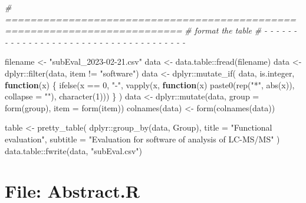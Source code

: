 \documentclass[
]{article}
\newenvironment{Shaded}{\begin{snugshade}}{\end{snugshade}}
\newcommand{\AttributeTok}[1]{\textcolor[rgb]{0.77,0.63,0.00}{#1}}
\newcommand{\CommentTok}[1]{\textcolor[rgb]{0.56,0.35,0.01}{\textit{#1}}}
\newcommand{\ControlFlowTok}[1]{\textcolor[rgb]{0.13,0.29,0.53}{\textbf{#1}}}
\newcommand{\DecValTok}[1]{\textcolor[rgb]{0.00,0.00,0.81}{#1}}
\newcommand{\FunctionTok}[1]{\textcolor[rgb]{0.00,0.00,0.00}{#1}}
\newcommand{\NormalTok}[1]{#1}
\newcommand{\OtherTok}[1]{\textcolor[rgb]{0.56,0.35,0.01}{#1}}
\newcommand{\SpecialCharTok}[1]{\textcolor[rgb]{0.00,0.00,0.00}{#1}}
\newcommand{\StringTok}[1]{\textcolor[rgb]{0.31,0.60,0.02}{#1}}
\begin{document}
\begin{Shaded}
\begin{Highlighting}[]
\CommentTok{\# ==========================================================================}
\CommentTok{\# format the table}
\CommentTok{\# {-} {-} {-} {-} {-} {-} {-} {-} {-} {-} {-} {-} {-} {-} {-} {-} {-} {-} {-} {-} {-} {-} {-} {-} {-} {-} {-} {-} {-} {-} {-} {-} {-} {-} {-} {-} {-}}

\NormalTok{filename }\OtherTok{\textless{}{-}} \StringTok{"subEval\_2023{-}02{-}21.csv"}
\NormalTok{data }\OtherTok{\textless{}{-}}\NormalTok{ data.table}\SpecialCharTok{::}\FunctionTok{fread}\NormalTok{(filename)}
\NormalTok{data }\OtherTok{\textless{}{-}}\NormalTok{ dplyr}\SpecialCharTok{::}\FunctionTok{filter}\NormalTok{(data, item }\SpecialCharTok{!=} \StringTok{"software"}\NormalTok{)}
\NormalTok{data }\OtherTok{\textless{}{-}}\NormalTok{ dplyr}\SpecialCharTok{::}\FunctionTok{mutate\_if}\NormalTok{(}
\NormalTok{  data, is.integer,}
  \ControlFlowTok{function}\NormalTok{(x) \{}
    \FunctionTok{ifelse}\NormalTok{(x }\SpecialCharTok{==} \DecValTok{0}\NormalTok{, }\StringTok{"{-}"}\NormalTok{, }
      \FunctionTok{vapply}\NormalTok{(x, }\ControlFlowTok{function}\NormalTok{(x) }\FunctionTok{paste0}\NormalTok{(}\FunctionTok{rep}\NormalTok{(}\StringTok{"*"}\NormalTok{, }\FunctionTok{abs}\NormalTok{(x)), }\AttributeTok{collapse =} \StringTok{""}\NormalTok{), }
        \FunctionTok{character}\NormalTok{(}\DecValTok{1}\NormalTok{)))}
\NormalTok{  \}}
\NormalTok{)}
\NormalTok{data }\OtherTok{\textless{}{-}}\NormalTok{ dplyr}\SpecialCharTok{::}\FunctionTok{mutate}\NormalTok{(data, }\AttributeTok{group =} \FunctionTok{form}\NormalTok{(group), }\AttributeTok{item =} \FunctionTok{form}\NormalTok{(item))}
\FunctionTok{colnames}\NormalTok{(data) }\OtherTok{\textless{}{-}} \FunctionTok{form}\NormalTok{(}\FunctionTok{colnames}\NormalTok{(data))}

\NormalTok{table }\OtherTok{\textless{}{-}} \FunctionTok{pretty\_table}\NormalTok{(}
\NormalTok{  dplyr}\SpecialCharTok{::}\FunctionTok{group\_by}\NormalTok{(data, Group), }\AttributeTok{title =} \StringTok{"Functional evaluation"}\NormalTok{, }
  \AttributeTok{subtitle =} \StringTok{"Evaluation for software of analysis of LC{-}MS/MS"}
\NormalTok{)}
\NormalTok{data.table}\SpecialCharTok{::}\FunctionTok{fwrite}\NormalTok{(data, }\StringTok{"subEval.csv"}\NormalTok{)}
\end{Highlighting}
\end{Shaded}

\hypertarget{file-abstract.r}{%
\section{File: Abstract.R}\label{file-abstract.r}}
\end{document}
